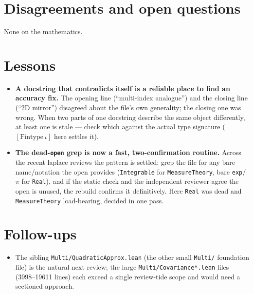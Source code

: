 \documentclass[11pt]{article}
\begin{document}
\section{Disagreements and open questions}
None on the mathematics.

\section{Lessons}
\begin{itemize}[noitemsep]
  \item \textbf{A docstring that contradicts itself is a reliable place to find an accuracy fix.} The opening
    line (``multi-index analogue'') and the closing line (``2D mirror'') disagreed about the file's own
    generality; the closing one was wrong. When two parts of one docstring describe the same object
    differently, at least one is stale --- check which against the actual type signature ($[\mathrm{Fintype}\
    \iota]$ here settles it).
  \item \textbf{The dead-\texttt{open} grep is now a fast, two-confirmation routine.} Across the recent laplace
    reviews the pattern is settled: grep the file for any bare name/notation the open provides
    (\texttt{Integrable} for \texttt{MeasureTheory}, bare \texttt{exp}/$\pi$ for \texttt{Real}), and if the
    static check and the independent reviewer agree the open is unused, the rebuild confirms it definitively.
    Here \texttt{Real} was dead and \texttt{MeasureTheory} load-bearing, decided in one pass.
\end{itemize}

\section{Follow-ups}
\begin{itemize}[noitemsep]
  \item The sibling \texttt{Multi/QuadraticApprox.lean} (the other small \texttt{Multi/} foundation file) is
    the natural next review; the large \texttt{Multi/Covariance*.lean} files (3998--19611 lines) each exceed a
    single review-tide scope and would need a sectioned approach.
\end{itemize}
\end{document}
